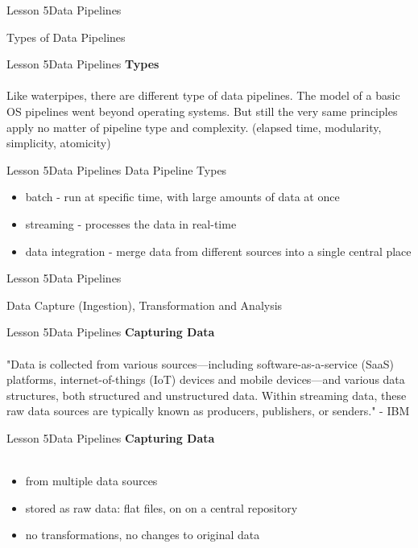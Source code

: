 \documentclass[aspectratio=1610]{beamer}
\begin{document}
\begin{frame}{Lesson 5}{Data Pipelines}
\Huge
\begin{center}
Types of Data Pipelines
\end{center}
\end{frame}


\begin{frame}{Lesson 5}{Data Pipelines}
\LARGE
\textbf{Types}\\~\\
Like waterpipes, there are different type of data pipelines. The model of a 
basic OS pipelines went beyond operating systems. But still the very same 
principles apply no matter of pipeline type and complexity. (elapsed time, 
modularity, simplicity, atomicity)
\end{frame}


\begin{frame}{Lesson 5}{Data Pipelines}
\LARGE
Data Pipeline Types
\begin{itemize}
    \item batch - run at specific time, with large amounts of data at once
    \item streaming - processes the data in real-time
    \item data integration - merge data from different sources into a single central place
\end{itemize}
\end{frame}




\begin{frame}{Lesson 5}{Data Pipelines}
\Huge
\begin{center}
Data Capture (Ingestion), Transformation and Analysis
\end{center}
\end{frame}


\begin{frame}{Lesson 5}{Data Pipelines}
\LARGE
\textbf{Capturing Data}\\~\\
"Data is collected from various sources—including software-as-a-service (SaaS) 
platforms, internet-of-things (IoT) devices and mobile devices—and various data 
structures, both structured and unstructured data. Within streaming data, these 
raw data sources are typically known as producers, publishers, or senders." -
IBM 
\end{frame}


\begin{frame}{Lesson 5}{Data Pipelines}
\LARGE
\textbf{Capturing Data}\\~\\
\begin{itemize}
    \item from multiple data sources
    \item stored as raw data: flat files, on on a central repository
    \item no transformations, no changes to original data
\end{itemize}
\end{frame}
\end{document}
